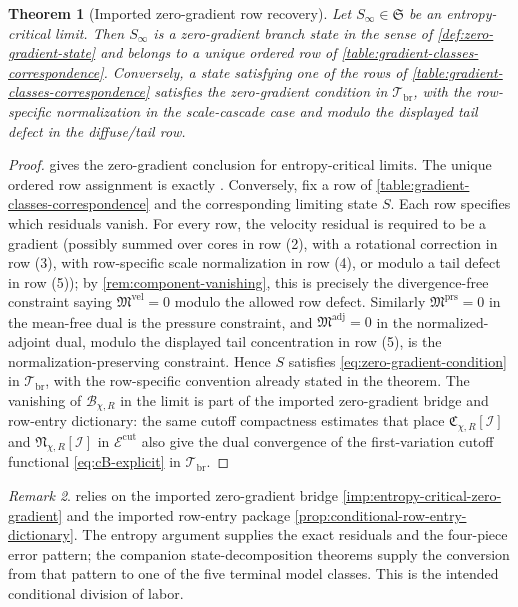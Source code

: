 \documentclass[11pt]{amsart}
\numberwithin{equation}{section}
\theoremstyle{plain}
\newtheorem{theorem}{Theorem}[section]
\theoremstyle{definition}
\theoremstyle{remark}
\newtheorem{remark}[theorem]{Remark}
\newcommand{\Err}{\mathcal E}
\newcommand{\State}{\mathfrak S}
\begin{document}
\begin{theorem}[Imported zero-gradient row recovery]
\label{thm:zero-gradient-recovery}
Let \(S_\infty\in\State\) be an entropy-critical limit.  Then \(S_\infty\) is
a zero-gradient branch state in the sense of \cref{def:zero-gradient-state}
and belongs to a unique ordered row of
\cref{table:gradient-classes-correspondence}.  Conversely, a state satisfying
one of the rows of \cref{table:gradient-classes-correspondence} satisfies the
zero-gradient condition in \(\mathcal T_{\mathrm{br}}\), with the row-specific
normalization in the scale-cascade case and modulo the displayed tail defect
in the diffuse/tail row.
\end{theorem}

\begin{proof}
 gives the zero-gradient conclusion
for entropy-critical limits.  The unique ordered row assignment is exactly
.  Conversely, fix a row of
\cref{table:gradient-classes-correspondence} and the corresponding limiting
state \(S\).  Each row specifies which residuals vanish.  For every row,
the velocity residual is required to be a gradient (possibly summed over
cores in row (2), with a rotational correction in row (3), with row-specific
scale normalization in row (4), or modulo a tail defect in row (5)); by
\cref{rem:component-vanishing}, this is precisely the divergence-free
constraint saying \(\mathfrak M^{\mathrm{vel}}=0\) modulo the allowed row
defect.  Similarly \(\mathfrak M^{\mathrm{prs}}=0\) in the mean-free dual is
the pressure constraint, and \(\mathfrak M^{\mathrm{adj}}=0\) in the
normalized-adjoint dual, modulo the displayed tail concentration in row (5),
is the normalization-preserving constraint.  Hence \(S\) satisfies
\eqref{eq:zero-gradient-condition} in \(\mathcal T_{\mathrm{br}}\), with the
row-specific convention already stated in the theorem.
The vanishing of \(\mathcal B_{\chi,R}\) in the limit is part of the
imported zero-gradient bridge and row-entry dictionary: the same cutoff
compactness estimates that place
\(\mathfrak C_{\chi,R}[\mathcal I]\) and
\(\mathfrak N_{\chi,R}[\mathcal I]\) in \(\Err^{\mathrm{cut}}\) also give
the dual convergence of the first-variation cutoff functional
\eqref{eq:cB-explicit} in \(\mathcal T_{\mathrm{br}}\).
\end{proof}

\begin{remark}
 relies on the imported zero-gradient bridge
\cref{imp:entropy-critical-zero-gradient} and the imported row-entry package
\cref{prop:conditional-row-entry-dictionary}.  The entropy argument supplies
the exact residuals and the four-piece error pattern; the companion
state-decomposition theorems supply the conversion from that pattern to one of
the five terminal model classes.  This is the intended conditional division of
labor.
\end{remark}
\end{document}
